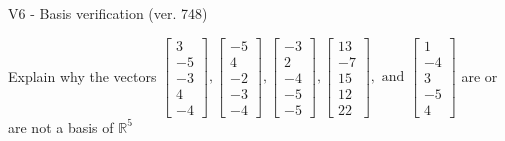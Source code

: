 \begin{exercise}
  \begin{exerciseTitle}V6 - Basis verification (ver. 748)\end{exerciseTitle}
  \begin{exerciseStatement}
    Explain why the vectors \(\left[\begin{array}{r}
3 \\
-5 \\
-3 \\
4 \\
-4
\end{array}\right] , \left[\begin{array}{r}
-5 \\
4 \\
-2 \\
-3 \\
-4
\end{array}\right] , \left[\begin{array}{r}
-3 \\
2 \\
-4 \\
-5 \\
-5
\end{array}\right] , \left[\begin{array}{r}
13 \\
-7 \\
15 \\
12 \\
22
\end{array}\right] , \text{ and } \left[\begin{array}{r}
1 \\
-4 \\
3 \\
-5 \\
4
\end{array}\right]\) are or are not a basis of \(\mathbb{R}^5\)	



\end{exerciseStatement}
\end{exercise}
